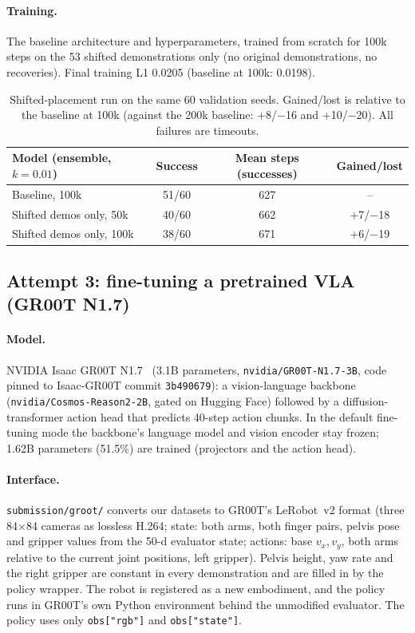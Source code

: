 \documentclass[11pt,a4paper]{article}
\begin{document}
\paragraph{Training.} The baseline architecture and hyperparameters, trained
from scratch for 100k steps on the 53 shifted demonstrations only (no
original demonstrations, no recoveries). Final training L1 0.0205 (baseline
at 100k: 0.0198).

\begin{table}[h]
\centering
\begin{tabular}{lccc}
\toprule
Model (ensemble, $k=0.01$) & Success & Mean steps (successes) & Gained/lost \\
\midrule
Baseline, 100k & 51/60 & 627 & -- \\
Shifted demos only, 50k & 40/60 & 662 & +7/$-$18 \\
Shifted demos only, 100k & 38/60 & 671 & +6/$-$19 \\
\bottomrule
\end{tabular}
\caption{Shifted-placement run on the same 60 validation seeds. Gained/lost
is relative to the baseline at 100k (against the 200k baseline: +8/$-$16
and +10/$-$20). All failures are timeouts.}
\label{tab:shift}
\end{table}

\subsection{Attempt 3: fine-tuning a pretrained VLA (GR00T N1.7)}
\label{sec:groot}

\paragraph{Model.} NVIDIA Isaac GR00T N1.7~\cite{groot} (3.1B parameters,
\texttt{nvidia/GR00T-N1.7-3B}, code pinned to Isaac-GR00T commit
\texttt{3b490679}): a vision-language backbone
(\texttt{nvidia/Cosmos-Reason2-2B}, gated on Hugging Face) followed by a
diffusion-transformer action head that predicts 40-step action chunks. In
the default fine-tuning mode the backbone's language model and vision
encoder stay frozen; 1.62B parameters (51.5\%) are trained (projectors and
the action head).

\paragraph{Interface.} \texttt{submission/groot/} converts our datasets to
GR00T's LeRobot~v2 format (three 84$\times$84 cameras as lossless H.264;
state: both arms, both finger pairs, pelvis pose and gripper values from the
50-d evaluator state; actions: base $v_x,v_y$, both arms relative to the
current joint positions, left gripper). Pelvis height, yaw rate and the right
gripper are constant in every demonstration and are filled in by the policy
wrapper. The robot is registered as a new embodiment, and the policy runs
in GR00T's own Python environment behind the unmodified evaluator.
The policy uses only \texttt{obs["rgb"]} and \texttt{obs["state"]}.
\end{document}
